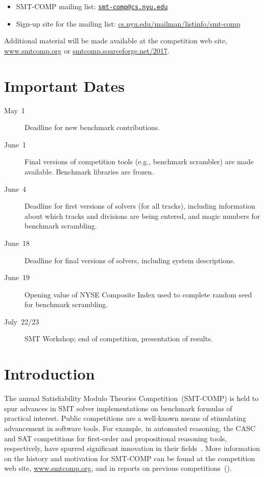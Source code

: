 \documentclass[12pt]{article}
\begin{document}
\begin{itemize}
\item SMT-COMP mailing list:
  \href{mailto:smt-comp@cs.nyu.edu}{\texttt{smt-comp@cs.nyu.edu}}
\item Sign-up site for the mailing list:
  \url{cs.nyu.edu/mailman/listinfo/smt-comp}
\end{itemize}

\noindent Additional material will be made available at the
competition web site, \url{www.smtcomp.org} or
\url{smtcomp.sourceforge.net/2017}.


\newpage

\section{Important Dates}
\label{sec:important}

\begin{description}
\item[May~1] Deadline for new benchmark contributions.
\item[June~1] Final versions of competition tools (e.g., benchmark
  scrambler) are made available.  Benchmark libraries are frozen.
\item[June~4] Deadline for first versions of solvers (for all tracks),
  including information about which tracks and divisions are being
  entered, and magic numbers for benchmark scrambling.
\item[June~18] Deadline for final versions of solvers, including
  system descriptions.
\item[June~19] Opening value of NYSE Composite Index used to complete
  random seed for benchmark scrambling.
\item[July~22/23] SMT Workshop; end of competition, presentation of
  results.
\end{description}


\section{Introduction}

The annual Satisfiability Modulo Theories Competition~(SMT-COMP) is
held to spur advances in SMT solver implementations on benchmark
formulas of practical interest.  Public competitions are a well-known
means of stimulating advancement in software tools.  For example, in
automated reasoning, the CASC and SAT competitions for first-order and
propositional reasoning tools, respectively, have spurred significant
innovation in their fields~\cite{leberre+03,PSS02}.  More information
on the history and motivation for SMT-COMP can be found at the
competition web site, \url{www.smtcomp.org}, and in reports on
previous
competitions~(\cite{SMTCOMP-JAR,SMTCOMP-FMSD,BDOS08,SMTCOMP-2008,CDW14,SMTCOMP-2012,CSW15}).
\end{document}
